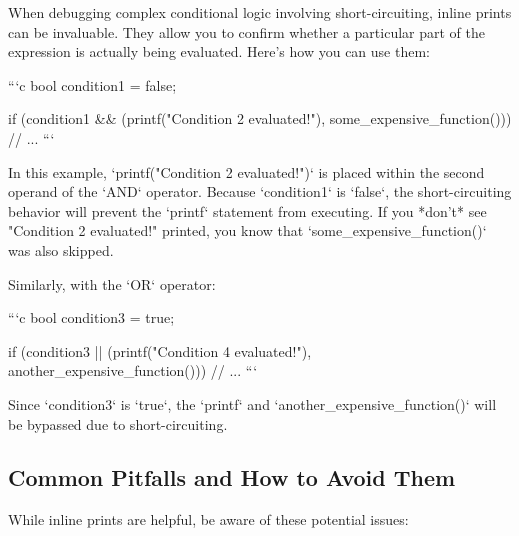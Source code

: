 \documentclass{article}
\begin{document}
{{{{When debugging complex conditional logic involving short-circuiting, inline prints can be invaluable. They allow you to confirm whether a particular part of the expression is actually being evaluated.  Here's how you can use them:

```c
bool condition1 = false;

if (condition1 && (printf("Condition 2 evaluated!\n"), some_expensive_function())) {
  // ...
}
```

In this example, `printf("Condition 2 evaluated!\n")` is placed within the second operand of the `AND` operator. Because `condition1` is `false`, the short-circuiting behavior will prevent the `printf` statement from executing.  If you *don't* see "Condition 2 evaluated!" printed, you know that `some_expensive_function()` was also skipped.

Similarly, with the `OR` operator:

```c
bool condition3 = true;

if (condition3 || (printf("Condition 4 evaluated!\n"), another_expensive_function())) {
  // ...
}
```

Since `condition3` is `true`, the `printf` and `another_expensive_function()` will be bypassed due to short-circuiting.

\subsection*{Common Pitfalls and How to Avoid Them}

While inline prints are helpful, be aware of these potential issues:

}}}}
\end{document}
